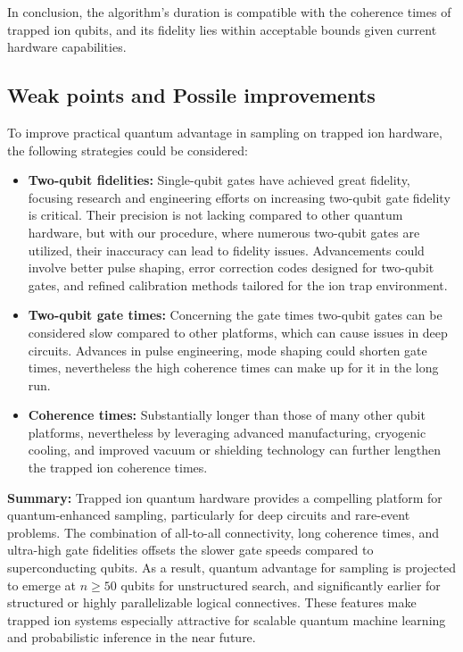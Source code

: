 \documentclass[encoding=utf8,british]{tumphthesis}
\begin{document}
In conclusion, the algorithm's duration is compatible with the coherence times of trapped ion qubits, and its fidelity lies within acceptable bounds given current hardware capabilities.

\pagebreak
\subsection{Weak points and Possile improvements}

To improve practical quantum advantage in sampling on trapped ion hardware, the following strategies could be considered:
\begin{itemize}
    \item \textbf{Two-qubit fidelities:} Single-qubit gates have achieved great fidelity, focusing research and engineering efforts on increasing two-qubit gate fidelity is critical. Their precision is not lacking compared
    to other quantum hardware, but with our procedure, where numerous two-qubit gates are utilized, their inaccuracy can lead to fidelity issues. Advancements could involve better pulse shaping, 
    error correction codes designed for two-qubit gates, and refined calibration methods tailored for the ion trap environment.
    \item \textbf{Two-qubit gate times:} Concerning the gate times two-qubit gates can be considered slow compared to other platforms, which can cause issues in deep circuits. Advances in pulse 
    engineering, mode shaping could shorten gate times, nevertheless the high coherence times can make up for it in the long run.
    \item \textbf{Coherence times:} Substantially longer than those of many other qubit platforms, nevertheless by leveraging advanced manufacturing, cryogenic cooling, and improved vacuum 
    or shielding technology can further lengthen the trapped ion coherence times.
\end{itemize}

\noindent
\textbf{Summary:} Trapped ion quantum hardware provides a compelling platform for quantum-enhanced sampling, particularly for deep circuits and rare-event problems. The combination of all-to-all 
connectivity, long coherence times, and ultra-high gate fidelities offsets the slower gate speeds compared to superconducting qubits. As a result, quantum advantage for sampling is projected to emerge at 
$n \geq 50$ qubits for unstructured search, and significantly earlier for structured or highly parallelizable logical connectives. These features make trapped ion systems especially attractive for scalable 
quantum machine learning and probabilistic inference in the near future.
\end{document}
